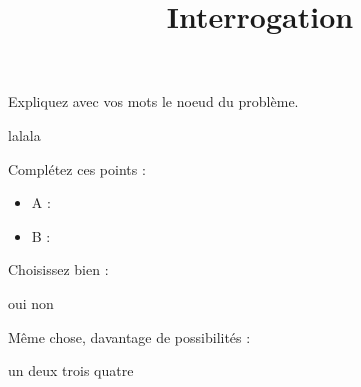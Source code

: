 \usepackage{amsmath}
\usepackage{graphicx}
\usepackage{url}
\title{Interrogation}

\maketitle

\begin{questions}
\question[1]
Expliquez avec vos mots le noeud du problème.
\begin{solutionordottedlines}[2cm]
lalala
\end{solutionordottedlines}

\question[2]
Complétez ces points :
\begin{itemize}
\item A : 
\item B : 
\end{itemize}

\question[1]
Choisissez bien :
\begin{oneparcheckboxes}
\choice oui
\correctchoice non
\end{oneparcheckboxes}

\question[1]
Même chose, davantage de possibilités :
\begin{checkboxes}
\choice un
\correctchoice deux
\choice trois
\choice quatre
\end{checkboxes}

\end{questions}

